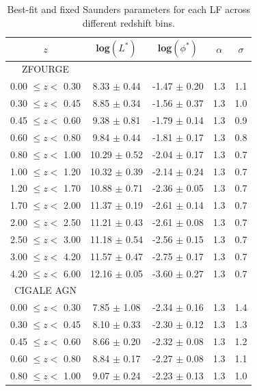 \begin{table}[ht!]
    \caption{Best-fit and fixed Saunders parameters for each LF across different redshift bins.}
    \label{Tab: Param Evo}
    \begin{center}
    \begin{tabular}{ccccc}
        \toprule
        $z$ & log$(L^{*})$ & log$(\phi^{*})$ & $\alpha$ & $\sigma$ \\
        \hline
        ZFOURGE \\
        \hline
        0.00 $\leq z <$ 0.30 &  8.33 $\pm$ 0.44 & -1.47 $\pm$ 0.20 & 1.3 & 1.1 \\
        0.30 $\leq z <$ 0.45 &  8.85 $\pm$ 0.34 & -1.56 $\pm$ 0.37 & 1.3 & 1.0 \\
        0.45 $\leq z <$ 0.60 &  9.38 $\pm$ 0.81 & -1.79 $\pm$ 0.14 & 1.3 & 0.9 \\
        0.60 $\leq z <$ 0.80 &  9.84 $\pm$ 0.44 & -1.81 $\pm$ 0.17 & 1.3 & 0.8 \\
        0.80 $\leq z <$ 1.00 & 10.29 $\pm$ 0.52 & -2.04 $\pm$ 0.17 & 1.3 & 0.7 \\
        1.00 $\leq z <$ 1.20 & 10.32 $\pm$ 0.39 & -2.14 $\pm$ 0.24 & 1.3 & 0.7 \\
        1.20 $\leq z <$ 1.70 & 10.88 $\pm$ 0.71 & -2.36 $\pm$ 0.05 & 1.3 & 0.7 \\
        1.70 $\leq z <$ 2.00 & 11.37 $\pm$ 0.19 & -2.61 $\pm$ 0.14 & 1.3 & 0.7 \\
        2.00 $\leq z <$ 2.50 & 11.21 $\pm$ 0.43 & -2.61 $\pm$ 0.08 & 1.3 & 0.7 \\
        2.50 $\leq z <$ 3.00 & 11.18 $\pm$ 0.54 & -2.56 $\pm$ 0.15 & 1.3 & 0.7 \\
        3.00 $\leq z <$ 4.20 & 11.57 $\pm$ 0.47 & -2.75 $\pm$ 0.17 & 1.3 & 0.7 \\
        4.20 $\leq z <$ 6.00 & 12.16 $\pm$ 0.05 & -3.60 $\pm$ 0.27 & 1.3 & 0.7 \\     
        \hline 
        CIGALE AGN \\
        \hline 
        0.00 $\leq z <$ 0.30 &  7.85 $\pm$ 1.08 & -2.34 $\pm$ 0.16 & 1.3 & 1.4 \\
        0.30 $\leq z <$ 0.45 &  8.10 $\pm$ 0.33 & -2.30 $\pm$ 0.12 & 1.3 & 1.3 \\
        0.45 $\leq z <$ 0.60 &  8.66 $\pm$ 0.20 & -2.32 $\pm$ 0.08 & 1.3 & 1.2 \\
        0.60 $\leq z <$ 0.80 &  8.84 $\pm$ 0.17 & -2.27 $\pm$ 0.08 & 1.3 & 1.1 \\
        0.80 $\leq z <$ 1.00 &  9.07 $\pm$ 0.24 & -2.23 $\pm$ 0.13 & 1.3 & 1.0 \\

\end{tabular}
\end{center}
\end{table}

